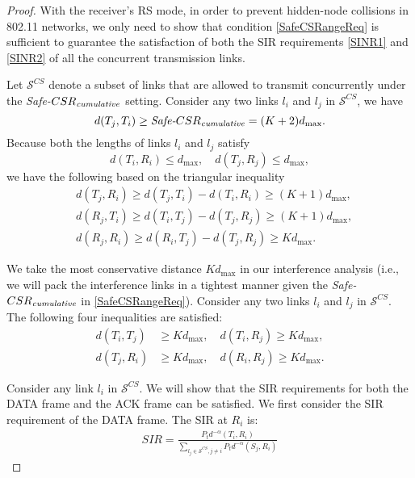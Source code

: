 \documentclass[conference]{IEEEtran}
\begin{document}
\begin{proof}
With the receiver's RS mode, in order to prevent hidden-node
collisions in 802.11 networks, we only need to show that condition
\eqref{SafeCSRangeReq} is suff\/icient to guarantee the satisfaction
of both the SIR requirements \eqref{SINR1} and \eqref{SINR2} of all
the concurrent transmission links.

Let $\mathcal{S}^{ CS}$ denote a subset of links that are allowed to
transmit concurrently under the
\emph{Safe-}$CSR_\text{\emph{cumulative}}$ setting. Consider any two
links $l_i$ and $l_j$ in $\mathcal{S}^{ CS}$, we have
\begin{equation}
d(T_j,T_i)\geq\text{\emph{Safe-}}CSR_\text{\emph{cumulative}}=(K+2)d_{\max}.\nonumber
\end{equation}
Because both the lengths of links $l_i$ and $l_j$ satisfy
\begin{equation}
d(T_i,R_i)\leq d_{\max}, \quad d(T_j,R_j)\leq d_{\max},\nonumber
\end{equation}
we have the following based on the triangular inequality
\begin{align}
&d(T_j,R_i)\geq d(T_j,T_i)-d(T_i,R_i)\geq (K+1)d_{\max },\nonumber\\
&d(R_j,T_i)\geq d(T_i,T_j)-d(T_j,R_j)\geq (K+1)d_{\max },\nonumber\\
&d(R_j,R_i)\geq d(R_i,T_j)-d(T_j,R_j)\geq Kd_{\max }.\nonumber
\end{align}

We take the most conservative distance $Kd_{\max }$ in our
interference analysis (i.e., we will pack the interference links in
a tightest manner given the
\emph{Safe-}$CSR_\text{\emph{cumulative}}$ in
\eqref{SafeCSRangeReq}). Consider any two links $l_i$ and $l_j$ in
$\mathcal{S}^{ CS}$. The following four inequalities are
satisf\/ied:
\begin{align}
d(T_i,T_j)&\geq Kd_{\max }, \quad d(T_i,R_j)\geq Kd_{\max },\nonumber \\
d(T_j,R_i)&\geq Kd_{\max }, \quad d(R_i,R_j)\geq Kd_{\max
}.\nonumber
\end{align}

Consider any link $l_i$ in $\mathcal{S}^{ CS}$. We will show that
the SIR requirements for both the DATA frame and the ACK frame can
be satisf\/ied. We f\/irst consider the SIR requirement of the DATA
frame. The SIR at $R_i$ is:
\begin{align}
SIR=\frac{P_td^{ - \alpha }\left( {T_i ,R_i }
\right)}{\sum\limits_{l_j\in \mathcal{S}^{ CS},j \ne i} {P_td^{ -
\alpha }\left( {S_j ,R_i } \right)} }\nonumber
\end{align}


\end{proof}
\end{document}
